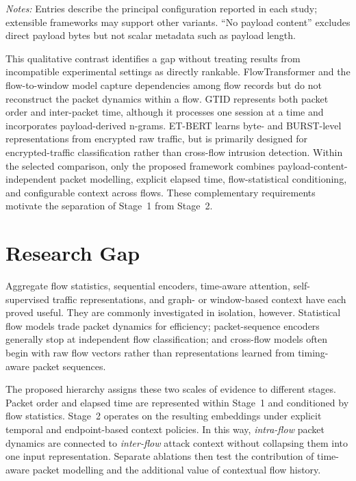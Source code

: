 \documentclass[11pt,fleqn]{report}
\begin{document}
\begin{table}[H]
\begin{minipage}{\textwidth}
\vspace{2pt}
\footnotesize
\emph{Notes:} Entries describe the principal configuration reported in each
study; extensible frameworks may support other variants. ``No payload
content'' excludes direct payload bytes but not scalar metadata such as
payload length.
\end{minipage}
\end{table}

This qualitative contrast identifies a gap without treating results from incompatible experimental settings as directly rankable. FlowTransformer and the flow-to-window model capture dependencies among flow records but do not reconstruct the packet dynamics within a flow. GTID represents both packet order and inter-packet time, although it processes one session at a time and incorporates payload-derived n-grams. ET-BERT learns byte- and BURST-level representations from encrypted raw traffic, but is primarily designed for encrypted-traffic classification rather than cross-flow intrusion detection. Within the selected comparison, only the proposed framework combines payload-content-independent packet modelling, explicit elapsed time, flow-statistical conditioning, and configurable context across flows. These complementary requirements motivate the separation of Stage~1 from Stage~2.
\section{Research Gap}
\label{subsec:rw_gap}

Aggregate flow statistics, sequential encoders, time-aware attention, self-supervised traffic representations, and graph- or window-based context have each proved useful. They are commonly investigated in isolation, however. Statistical flow models trade packet dynamics for efficiency; packet-sequence encoders generally stop at independent flow classification; and cross-flow models often begin with raw flow vectors rather than representations learned from timing-aware packet sequences.

The proposed hierarchy assigns these two scales of evidence to different stages. Packet order and elapsed time are represented within Stage~1 and conditioned by flow statistics. Stage~2 operates on the resulting embeddings under explicit temporal and endpoint-based context policies. In this way, \emph{intra-flow} packet dynamics are connected to \emph{inter-flow} attack context without collapsing them into one input representation. Separate ablations then test the contribution of time-aware packet modelling and the additional value of contextual flow history.
\end{document}
